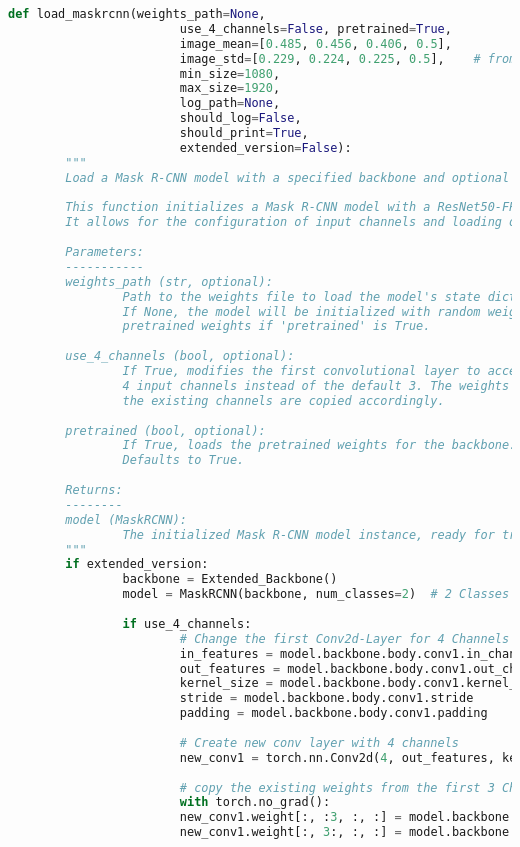 \begin{lstlisting}[language=Python,caption=Random Augmentation of the Background using cv2 in Python, label=lst:bg-augmentation]
def load_maskrcnn(weights_path=None, 
						use_4_channels=False, pretrained=True,
						image_mean=[0.485, 0.456, 0.406, 0.5], 
						image_std=[0.229, 0.224, 0.225, 0.5],    # from ImageNet
						min_size=1080, 
						max_size=1920, 
						log_path=None, 
						should_log=False, 
						should_print=True,
						extended_version=False):
		"""
		Load a Mask R-CNN model with a specified backbone and optional modifications.
		
		This function initializes a Mask R-CNN model with a ResNet50-FPN backbone. 
		It allows for the configuration of input channels and loading of pretrained weights.
		
		Parameters:
		-----------
		weights_path (str, optional): 
				Path to the weights file to load the model's state dict. 
				If None, the model will be initialized with random weights or 
				pretrained weights if 'pretrained' is True.
		
		use_4_channels (bool, optional): 
				If True, modifies the first convolutional layer to accept 
				4 input channels instead of the default 3. The weights from 
				the existing channels are copied accordingly.
		
		pretrained (bool, optional): 
				If True, loads the pretrained weights for the backbone. 
				Defaults to True.
		
		Returns:
		--------
		model (MaskRCNN): 
				The initialized Mask R-CNN model instance, ready for training or inference.
		"""
		if extended_version:
				backbone = Extended_Backbone()
				model = MaskRCNN(backbone, num_classes=2)  # 2 Classes (Background + 1 Object)
				
				if use_4_channels:
						# Change the first Conv2d-Layer for 4 Channels
						in_features = model.backbone.body.conv1.in_channels
						out_features = model.backbone.body.conv1.out_channels
						kernel_size = model.backbone.body.conv1.kernel_size
						stride = model.backbone.body.conv1.stride
						padding = model.backbone.body.conv1.padding
						
						# Create new conv layer with 4 channels
						new_conv1 = torch.nn.Conv2d(4, out_features, kernel_size=kernel_size, stride=stride, padding=padding)
						
						# copy the existing weights from the first 3 Channels
						with torch.no_grad():
						new_conv1.weight[:, :3, :, :] = model.backbone.body.conv1.weight  # Copy old 3 Channels
						new_conv1.weight[:, 3:, :, :] = model.backbone.body.conv1.weight[:, :1, :, :]  # Init new 4.th Channel with the one old channel
						

\end{lstlisting}
